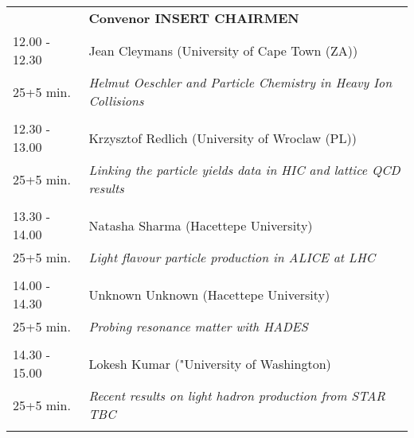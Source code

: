 \begin{longtable}{p{3cm}p{13cm}}
&\hfill {\bf Convenor INSERT CHAIRMEN }\\ 
12.00 - 12.30 & Jean Cleymans (University of Cape Town (ZA))\\ 
25+5 min. & {\it Helmut Oeschler and Particle Chemistry in Heavy Ion Collisions}\\ 
 & \\ 
12.30 - 13.00 & Krzysztof Redlich (University of Wroclaw (PL))\\ 
25+5 min. & {\it Linking the particle yields data in HIC and lattice QCD results}\\ 
 & \\ 
13.30 - 14.00 & Natasha Sharma (Hacettepe University)\\ 
25+5 min. & {\it Light flavour particle production in ALICE at LHC}\\ 
 & \\ 
14.00 - 14.30 & Unknown Unknown (Hacettepe University)\\ 
25+5 min. & {\it Probing resonance matter with HADES}\\ 
 & \\ 
14.30 - 15.00 & Lokesh Kumar ("University of Washington)\\ 
25+5 min. & {\it Recent results on light hadron production from STAR TBC}\\ 
 & \\ 
\end{longtable}

